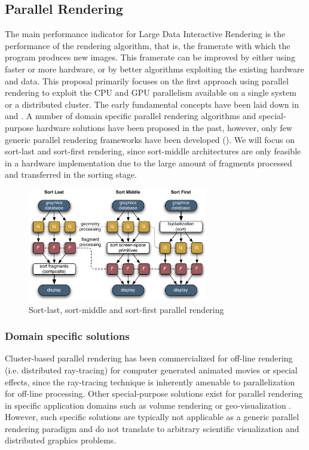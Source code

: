 \subsection{Parallel Rendering}

The main performance indicator for Large Data Interactive Rendering is the
performance of the rendering algorithm, that is, the framerate with which the
program produces new images. This framerate can be improved by either using
faster or more hardware, or by better algorithms exploiting the existing
hardware and data. This proposal primarily focuses on the first approach using
parallel rendering to exploit the CPU and GPU parallelism available on a single
system or a distributed cluster.  The early fundamental concepts have been laid
down in \cite{MCEF:94} and \cite{Crockett:97}. A number of domain specific
parallel rendering algorithms and special-purpose hardware solutions have been
proposed in the past, however, only few generic parallel rendering frameworks
have been developed (). We will focus on sort-last and sort-first
rendering, since sort-middle architectures are only feasible in a hardware
implementation due to the large amount of fragments processed and transferred in
the sorting stage.

\begin{figure}[ht]\center
\includegraphics[width=0.7\textwidth]{images/all_sorts}%
\caption{Sort-last, sort-middle and sort-first parallel rendering\label{fSorts}}
\end{figure}


\subsubsection{Domain specific solutions}

Cluster-based parallel rendering has been commercialized for off-line rendering
(i.e. distributed ray-tracing) for computer generated animated movies or special
effects, since the ray-tracing technique is inherently amenable to
parallelization for off-line processing. Other special-purpose solutions exist
for parallel rendering in specific application domains such as volume rendering
\cite{LWMT:97,Wittenbrink:98,HSCSM:00,SL:02,GS:02,NSJLYZ:05} or
geo-visualization \cite{VR:91,AG:95,LDC:96,JLMV:06}. However, such specific
solutions are typically not applicable as a generic parallel rendering paradigm
and do not translate to arbitrary scientific visualization and distributed
graphics problems.

